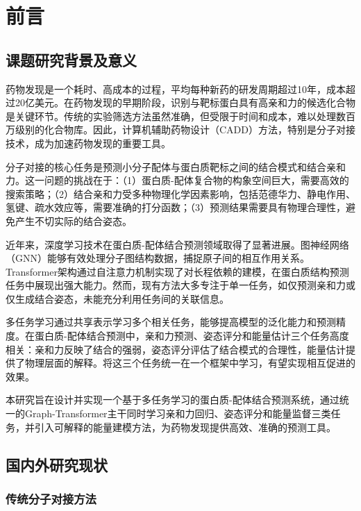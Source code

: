
\section{前言}
\subsection{课题研究背景及意义}

药物发现是一个耗时、高成本的过程，平均每种新药的研发周期超过10年，成本超过20亿美元。在药物发现的早期阶段，识别与靶标蛋白具有高亲和力的候选化合物是关键环节。传统的实验筛选方法虽然准确，但受限于时间和成本，难以处理数百万级别的化合物库。因此，计算机辅助药物设计（CADD）方法，特别是分子对接技术，成为加速药物发现的重要工具。

分子对接的核心任务是预测小分子配体与蛋白质靶标之间的结合模式和结合亲和力。这一问题的挑战在于：（1）蛋白质-配体复合物的构象空间巨大，需要高效的搜索策略；（2）结合亲和力受多种物理化学因素影响，包括范德华力、静电作用、氢键、疏水效应等，需要准确的打分函数；（3）预测结果需要具有物理合理性，避免产生不切实际的结合姿态。

近年来，深度学习技术在蛋白质-配体结合预测领域取得了显著进展。图神经网络（GNN）能够有效处理分子图结构数据，捕捉原子间的相互作用关系。Transformer架构通过自注意力机制实现了对长程依赖的建模，在蛋白质结构预测任务中展现出强大能力。然而，现有方法大多专注于单一任务，如仅预测亲和力或仅生成结合姿态，未能充分利用任务间的关联信息。

多任务学习通过共享表示学习多个相关任务，能够提高模型的泛化能力和预测精度。在蛋白质-配体结合预测中，亲和力预测、姿态评分和能量估计三个任务高度相关：亲和力反映了结合的强弱，姿态评分评估了结合模式的合理性，能量估计提供了物理层面的解释。将这三个任务统一在一个框架中学习，有望实现相互促进的效果。

本研究旨在设计并实现一个基于多任务学习的蛋白质-配体结合预测系统，通过统一的Graph-Transformer主干同时学习亲和力回归、姿态评分和能量监督三类任务，并引入可解释的能量建模方法，为药物发现提供高效、准确的预测工具。

\subsection{国内外研究现状}
\subsubsection{传统分子对接方法}

